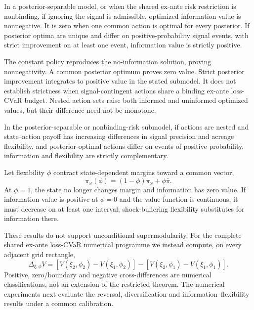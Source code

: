 \begin{theorem}
In a posterior-separable model, or when the shared ex-ante risk restriction is
nonbinding, if ignoring the signal is admissible, optimized information value
is nonnegative. It is zero when one common action is optimal for every
posterior. If posterior optima are unique and differ on positive-probability
signal events, with strict improvement on at least one event, information
value is strictly positive.
\end{theorem}

The constant policy reproduces the no-information solution, proving
nonnegativity. A common posterior optimum proves zero value. Strict posterior
improvement integrates to positive value in the stated submodel. It does not
establish strictness when signal-contingent actions share a binding ex-ante
loss-CVaR budget. Nested action sets raise both
informed and uninformed optimized values, but their difference need not be
monotone.

\begin{proposition}
In the posterior-separable or nonbinding-risk submodel, if actions are nested
and state--action payoff has increasing differences in
signal precision and acreage flexibility, and posterior-optimal actions differ
on events of positive probability, information and flexibility are strictly
complementary.
\end{proposition}

\begin{proposition}
Let flexibility \(\phi\) contract state-dependent margins toward a common
vector,
\[
\pi_\omega(\phi)=(1-\phi)\pi_\omega+\phi\bar\pi.
\]
At \(\phi=1\), the state no longer changes margin and information has zero
value. If information value is positive at \(\phi=0\) and the value function
is continuous, it must decrease on at least one interval; shock-buffering
flexibility substitutes for information there.
\end{proposition}

These results do not support unconditional supermodularity. For the complete
shared ex-ante loss-CVaR numerical programme we instead compute, on every adjacent
grid rectangle,
\[
\Delta_{\xi,\phi}V=
[V(\xi_2,\phi_2)-V(\xi_1,\phi_2)]
-[V(\xi_2,\phi_1)-V(\xi_1,\phi_1)].
\]
Positive, zero/boundary and negative cross-differences are numerical
classifications, not an extension of the restricted theorem. The numerical
experiments next evaluate the reversal, diversification and
information--flexibility results under a common calibration.
